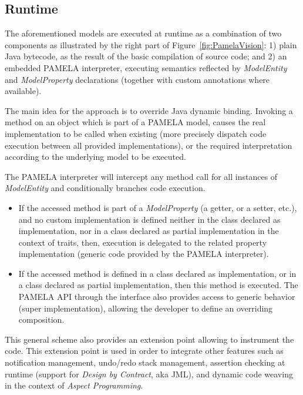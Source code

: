  \subsection{Runtime}
 \label{sub:RunTime}
 
 The aforementioned models are executed at runtime as a combination of two components as illustrated by  the right part of Figure~\ref{fig:PamelaVision}: 1) plain Java bytecode, as the result of the basic compilation of source code; and 2) an embedded PAMELA interpreter, executing semantics reflected by \emph{ModelEntity} and \emph{ModelProperty}  declarations (together with custom annotations where available).

The main idea for the approach is to override Java dynamic binding. Invoking a method on an object which is part of a PAMELA model, causes the real implementation to be called when existing (more precisely dispatch code execution between all provided implementations), or the required interpretation according to the underlying model to be executed. 
 
The PAMELA interpreter will intercept any method call for all instances of \emph{ModelEntity} and conditionally branches code execution.
 \begin{itemize}
     \item If the accessed method is part of a \emph{ModelProperty} (a getter, or a setter, etc.), and no custom implementation is defined neither in the class declared as implementation, nor in a class declared as partial implementation in the context of traits, then, execution is delegated to the related property implementation (generic code provided by the PAMELA interpreter).
     \item If the accessed method is defined in a class declared as implementation, or in a class declared as partial implementation, then this method is executed. The PAMELA API through the  interface also provides access to generic behavior (super implementation), allowing the developer to define an overriding composition.
 \end{itemize}
 
This general scheme also provides an extension point allowing to instrument the code. This extension point is used in order to integrate other features such as notification management, undo/redo stack management, assertion checking at runtime (support for \emph{Design by Contract}, aka JML), and dynamic code weaving in the context of \emph{Aspect Programming}.

